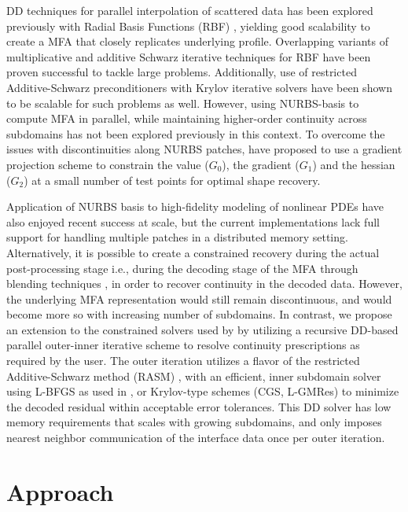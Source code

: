 \documentclass[conference]{IEEEtran}
\begin{document}
DD techniques for parallel interpolation of scattered data has been explored previously with Radial Basis Functions (RBF) \cite{mai-approx-rbf}, yielding good scalability to create a MFA that closely replicates underlying profile. Overlapping variants of multiplicative and additive Schwarz iterative techniques for RBF \cite{ddm-rbf} have been proven successful to tackle large problems. Additionally, use of restricted Additive-Schwarz preconditioners with Krylov iterative solvers have been shown to be scalable \cite{yokota-rasm-rbf} for such problems as well. However, using NURBS-basis to compute MFA in parallel, while maintaining higher-order continuity across subdomains has not been explored previously in this context. To overcome the issues with discontinuities along NURBS patches, \cite{zhang-nurbs-continuity} have proposed to use a gradient projection scheme to constrain the value ($G_0$), the gradient ($G_1$) and the hessian ($G_2$) at a small number of test points for optimal shape recovery. 

Application of NURBS basis to high-fidelity modeling of nonlinear PDEs have also enjoyed recent success \cite{petiga-dalcin-2016} at scale, but the current implementations lack full support for handling multiple patches in a distributed memory setting.  Alternatively, it is possible to create a constrained recovery during the actual post-processing stage i.e., during the decoding stage of the MFA through blending techniques \cite{grindeanu-blending}, in order to recover continuity in the decoded data. However, the underlying MFA representation would still remain discontinuous, and would become more so with increasing number of subdomains. In contrast, we propose an extension to the constrained solvers used by \cite{zhang-nurbs-continuity, xu-jahn-discrete-adjoint} by utilizing a recursive DD-based parallel outer-inner iterative scheme to resolve continuity prescriptions as required by the user. The outer iteration utilizes a flavor of the restricted Additive-Schwarz method (RASM) \cite{gander-rasm}, with an efficient, inner subdomain solver using L-BFGS as used in \cite{zheng-bo-bspline-bfgs}, or Krylov-type schemes (CGS, L-GMRes) to minimize the decoded residual within acceptable error tolerances. This DD solver has low memory requirements that scales with growing subdomains, and only imposes nearest neighbor communication of the interface data once per outer iteration. 

\section{Approach}
\end{document}
